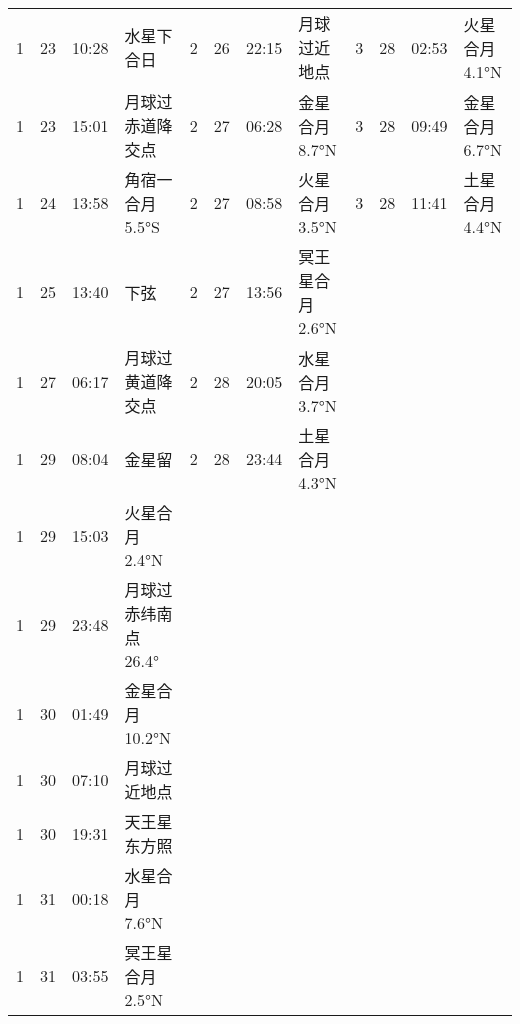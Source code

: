 \begin{tabular}{llll|llll|llll}
1 & 23 & 10:28 & 水星下合日 & 2 & 26 & 22:15 & 月球过近地点 & 3 & 28 & 02:53 & 火星合月 4.1°N \tabularnewline
1 & 23 & 15:01 & 月球过赤道降交点 & 2 & 27 & 06:28 & 金星合月 8.7°N & 3 & 28 & 09:49 & 金星合月 6.7°N \tabularnewline
1 & 24 & 13:58 & 角宿一合月 5.5°S & 2 & 27 & 08:58 & 火星合月 3.5°N & 3 & 28 & 11:41 & 土星合月 4.4°N \tabularnewline
1 & 25 & 13:40 & 下弦 & 2 & 27 & 13:56 & 冥王星合月 2.6°N &  &  &  &  \tabularnewline
1 & 27 & 06:17 & 月球过黄道降交点 & 2 & 28 & 20:05 & 水星合月 3.7°N &  &  &  &  \tabularnewline
1 & 29 & 08:04 & 金星留 & 2 & 28 & 23:44 & 土星合月 4.3°N &  &  &  &  \tabularnewline
1 & 29 & 15:03 & 火星合月 2.4°N &  &  &  &  &  &  &  &  \tabularnewline
1 & 29 & 23:48 & 月球过赤纬南点 26.4° &  &  &  &  &  &  &  &  \tabularnewline
1 & 30 & 01:49 & 金星合月 10.2°N &  &  &  &  &  &  &  &  \tabularnewline
1 & 30 & 07:10 & 月球过近地点 &  &  &  &  &  &  &  &  \tabularnewline
1 & 30 & 19:31 & 天王星东方照 &  &  &  &  &  &  &  &  \tabularnewline
1 & 31 & 00:18 & 水星合月 7.6°N &  &  &  &  &  &  &  &  \tabularnewline
1 & 31 & 03:55 & 冥王星合月 2.5°N &  &  &  &  &  &  &  &  \tabularnewline
\hline \end{tabular}

